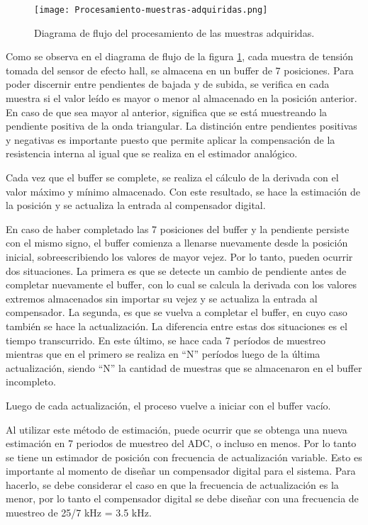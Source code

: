 \begin{figure}[H]
	\centering
	\texttt{[image: Procesamiento-muestras-adquiridas.png]}
	\caption{ Diagrama de flujo del procesamiento de las muestras adquiridas.}
	\label{fig:procesamiento-muestras-adquiridas}
\end{figure}


\noindent Como se observa en el diagrama de flujo de la figura \ref{fig:procesamiento-muestras-adquiridas}, cada muestra de tensión tomada del sensor de efecto hall, se almacena en un buffer de 7 posiciones. Para poder discernir entre pendientes de bajada y de subida, se verifica en cada muestra si el valor leído es mayor o menor al almacenado en la posición anterior. En caso de que sea mayor al anterior, significa que se está muestreando la pendiente positiva de la onda triangular. La distinción entre pendientes positivas y negativas es importante puesto que permite aplicar la compensación de la resistencia interna al igual que se realiza en el estimador analógico. 

\noindent Cada vez que el buffer se complete, se realiza el cálculo de la derivada con el valor máximo y mínimo almacenado. Con este resultado, se hace la estimación de la posición y se actualiza la entrada al compensador digital.

\noindent En caso de haber completado las 7 posiciones del buffer y la pendiente persiste con el mismo signo, el buffer comienza a llenarse nuevamente desde la posición inicial, sobreescribiendo los valores de mayor vejez. Por lo tanto, pueden ocurrir dos situaciones. La primera es que se detecte un cambio de pendiente antes de completar nuevamente el buffer, con lo cual se calcula la derivada con los valores extremos almacenados sin importar su vejez y se actualiza la entrada al compensador. La segunda, es que se vuelva a completar el buffer, en cuyo caso también se hace la actualización. La diferencia entre estas dos situaciones es el tiempo transcurrido. En este último, se hace cada 7 períodos de muestreo mientras que en el primero se realiza en “N” períodos luego de la última actualización, siendo “N” la cantidad de muestras que se almacenaron en el buffer incompleto.

\noindent Luego de cada actualización, el proceso vuelve a iniciar con el buffer vacío.

\noindent Al utilizar este método de estimación, puede ocurrir que se obtenga una nueva estimación en 7 periodos de muestreo del ADC, o incluso en menos. Por lo tanto se tiene un estimador de posición con frecuencia de actualización variable. Esto es importante al momento de diseñar un compensador digital para el sistema. Para hacerlo, se debe considerar el caso en que la frecuencia de actualización es la menor, por lo tanto el compensador digital se debe diseñar con una frecuencia de muestreo de 25/7 kHz = 3.5 kHz.

